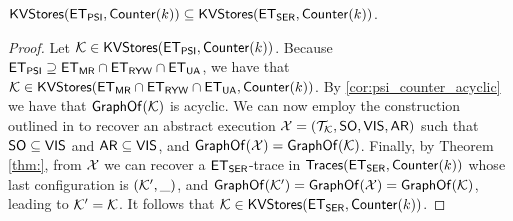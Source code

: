 \begin{corollary}
$\mathsf{KVStores}(\mathsf{ET}_{\mathsf{PSI}}, \mathsf{Counter}(k)) \subseteq \mathsf{KVStores}(\mathsf{ET}_{\mathsf{SER}}, \mathsf{Counter}(k))$. 
\end{corollary}

\begin{proof}
Let $\mathcal{K} \in \mathsf{KVStores}(\mathsf{ET}_{\mathsf{PSI}}, \mathsf{Counter}(k))$. Because $\mathsf{ET}_{\mathsf{PSI}} \supseteq \mathsf{ET}_{\mathsf{MR}} \cap \mathsf{ET}_{\mathsf{RYW}} \cap \mathsf{ET}_{\mathsf{UA}}$, 
we have that $\mathcal{K} \in \mathsf{KVStores}(\mathsf{ET}_{\mathsf{MR}} \cap \mathsf{ET}_{\mathsf{RYW}} \cap \mathsf{ET}_{\mathsf{UA}}, \mathsf{Counter}(k))$. 
By \cref{cor:psi_counter_acyclic} we have that $\mathsf{GraphOf}(\mathcal{K})$ is acyclic. We can now employ the construction 
outlined in \cite{?,laws} to recover an abstract execution $\mathcal{X} = (\mathcal{T}_{\mathcal{K}}, \mathsf{SO}, \mathsf{VIS}, \mathsf{AR})$ such that $\mathsf{SO} \subseteq \mathsf{VIS}$ and $\mathsf{AR} \subseteq \mathsf{VIS}$, 
and $\mathsf{GraphOf}(\mathcal{X}) = \mathsf{GraphOf}(\mathcal{K})$.
Finally, by Theorem \ref{thm:}, from $\mathcal{X}$ we can recover a $\mathsf{ET}_{\mathsf{SER}}$-trace in 
$\mathsf{Traces}(\mathsf{ET}_{\mathsf{SER}}, \mathsf{Counter}(k))$
whose last configuration is $(\mathcal{K}', \_)$, and 
$\mathsf{GraphOf}(\mathcal{K}') = \mathsf{GraphOf}(\mathcal{X}) = \mathsf{GraphOf}(\mathcal{K})$, leading to $\mathcal{K}' = \mathcal{K}$. It follows that $\mathcal{K} \in 
\mathsf{KVStores}(\mathsf{ET}_{\mathsf{SER}}, \mathsf{Counter}(k))$.
\end{proof}